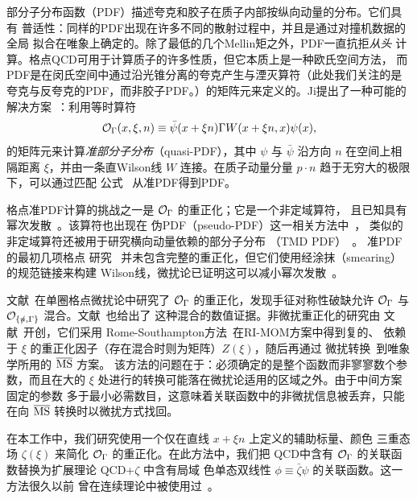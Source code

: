 部分子分布函数（PDF）描述夸克和胶子在质子内部按纵向动量的分布。它们具有
普适性：同样的PDF出现在许多不同的散射过程中，并且是通过对撞机数据的全局
拟合在唯象上确定的。除了最低的几个Mellin矩之外，PDF一直抗拒\emph{从头}
计算。格点QCD可用于计算质子的许多性质，但它本质上是一种欧氏空间方法，
而PDF是在闵氏空间中通过沿光锥分离的夸克产生与湮灭算符（此处我们关注的是
夸克与反夸克的PDF，而非胶子PDF。）的矩阵元来定义的。Ji提出了一种可能的
解决方案~\cite{Ji:2013dva}：利用等时算符
\begin{equation}
  \mathcal{O}_\Gamma(x,\xi,n) \equiv
  \bar\psi(x+\xi n) \Gamma W(x+\xi n,x)\psi(x),
\end{equation}
的矩阵元来计算\emph{准部分子分布}（quasi-PDF），其中 $\psi$ 与
$\bar\psi$ 沿方向 $n$ 在空间上相隔距离 $\xi$，并由一条直Wilson线 $W$
连接。在质子动量分量 $p\cdot n$ 趋于无穷大的极限下，可以通过匹配
公式~\cite{Xiong:2013bka,Alexandrou:2015rja} 从准PDF得到PDF。

格点准PDF计算的挑战之一是 $\mathcal{O}_\Gamma$ 的重正化；它是一个非定域算符，
且已知具有幂次发散~\cite{Ishikawa:2016znu,Chen:2016fxx}。该算符也出现在
伪PDF（pseudo-PDF）这一相关方法中~\cite{Radyushkin:2017cyf,Orginos:2017kos}，
类似的非定域算符还被用于研究横向动量依赖的部分子分布
（TMD PDF）~\cite{Musch:2011er,Engelhardt:2015xja,Yoon:2017qzo}。
准PDF的最初几项格点
研究~\cite{Lin:2014zya,Alexandrou:2015rja,Chen:2016utp,Alexandrou:2016jqi}
并未包含完整的重正化，但它们使用经涂抹（smearing）的规范链接来构建
Wilson线，微扰论已证明这可以减小幂次发散~\cite{Ishikawa:2016znu}。

文献~\cite{Constantinou:2017sej}在单圈格点微扰论中研究了 $\mathcal{O}_\Gamma$
的重正化，发现手征对称性破缺允许 $\mathcal{O}_\Gamma$ 与
$\mathcal{O}_{\{\slashed{n},\Gamma\}}$ 混合。文献~\cite{Yoon:2017qzo}也给出了
这种混合的数值证据。非微扰重正化的研究由
文献~\cite{Alexandrou:2017huk,Chen:2017mzz}开创，它们采用
Rome-Southampton方法~\cite{Martinelli:1994ty}在RI-MOM方案中得到复的、
依赖于 $\xi$ 的重正化因子（存在混合时则为矩阵）$Z(\xi)$，随后再通过
微扰转换~\cite{Constantinou:2017sej}到唯象学所用的 $\overline{\text{MS}}$ 方案。
该方法的问题在于：必须确定的是整个函数而非寥寥数个参数，而且在大的
$\xi$ 处进行的转换可能落在微扰论适用的区域之外。由于中间方案固定的参数
多于最小必需数目，这意味着关联函数中的非微扰信息被丢弃，只能在向
$\overline{\text{MS}}$ 转换时以微扰方式找回。

在本工作中，我们研究使用一个仅在直线 $x+\xi n$ 上定义的辅助标量、颜色
三重态场 $\zeta(\xi)$ 来简化 $\mathcal{O}_\Gamma$ 的重正化。在此方法中，我们把
QCD中含有 $\mathcal{O}_\Gamma$ 的关联函数替换为扩展理论 QCD+$\zeta$ 中含有局域
色单态双线性 $\phi\equiv \bar\zeta\psi$ 的关联函数。这一方法很久以前
曾在连续理论中被使用过~\cite{Craigie:1980qs,Dorn:1986dt}。


